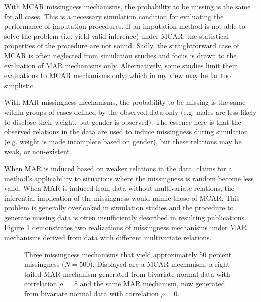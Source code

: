 \documentclass[bimj,fleqn]{w-art}
\theoremstyle{plain}
\theoremstyle{definition}
\begin{document}
With MCAR missingness mechanisms, the probability to be missing is the same for all cases. This is a necessary simulation condition for evaluating the performance of imputation procedures. If an imputation method is not able to solve the problem (i.e. yield valid inference) under MCAR, the statistical properties of the procedure are not sound. Sadly, the straightforward case of MCAR is often neglected from simulation studies and focus is drawn to the evaluation of MAR mechanisms only. Alternatively, some studies limit their evaluations to MCAR mechanisms only, which in my view may be far too simplistic. 

With MAR missingness mechanisms, the probability to be missing is the same within groups of cases defined by the observed data only (e.g. males are less likely to disclose their weight, but gender is observed). The essence here is that the observed relations in the data are used to induce missingness during simulation (e.g. weight is made incomplete based on gender), but these relations may be weak, or non-existent. 

When MAR is induced based on weaker relations in the data, claims for a method's applicability to situations where the missingness is random become less valid. When MAR is induced from data without multivariate relations, the inferential implication of the missingness would mimic those of MCAR. This problem is generally overlooked in simulation studies and the procedure to generate missing data is often insufficiently described in resulting publications. Figure \ref{fig:MAR} demonstrates two realizations of missingness mechanisms under MAR mechanisms derived from data with different multivariate relations. 

\begin{figure}[htb]
\begin{center}
\caption{Three missingness mechanisms that yield approximately 50 percent missingness ($N=500$). Displayed are a MCAR mechanism, a right-tailed MAR mechanism generated from bivariate normal data with correlation $\rho=.8$ and the same MAR mechanism, now generated from bivariate normal data with correlation $\rho= 0$.}
\end{center}
\label{fig:MAR}
\end{figure}
\vspace*{1pc}
\end{document}
